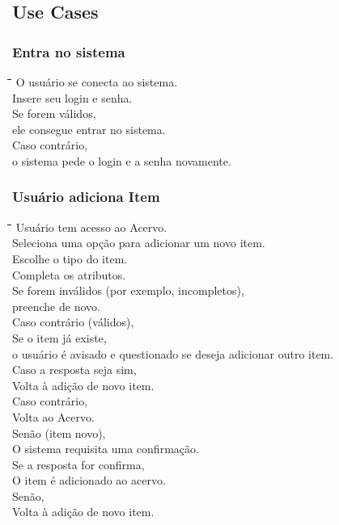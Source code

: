 \newcommand{\pgs}{\hspace{0.6cm}\=\hspace{0.5cm}\=\hspace{0.5cm}\=\hspace{0.5cm}\=\hspace{0.5cm}\=\hspace{0.5cm}\= \kill}

\subsection{Use Cases}

\subsubsection{Entra no sistema}
\begin{tabbing}
\pgs
\>\>O usuário se conecta ao sistema.\\
\>\>Insere seu login e senha.\\
\>\>Se forem válidos,\\
\>\>\>ele consegue entrar no sistema.\\
\>\>Caso contrário,\\
\>\>\>o sistema pede o login e a senha novamente.
\end{tabbing}

\subsubsection{Usuário adiciona Item}
\begin{tabbing}
\pgs
\>\>Usuário tem acesso ao Acervo.\\
\>\>Seleciona uma opção para adicionar um novo item.\\
\>\>Escolhe o tipo do item.\\
\>\>Completa os atributos.\\
\>\>Se forem inválidos (por exemplo, incompletos),\\
\>\>\>preenche de novo.\\
\>\>Caso contrário (válidos),\\
\>\>\>Se o item já existe,\\
\>\>\>\>o usuário é avisado e questionado se deseja adicionar outro item.\\
\>\>\>\>Caso a resposta seja sim,\\
\>\>\>\>\>Volta à adição de novo item.\\
\>\>\>\>Caso contrário,\\
\>\>\>\>\>Volta ao Acervo.\\
\>\>\>Senão (item novo),\\
\>\>\>\>O sistema requisita uma confirmação.\\
\>\>\>\>Se a resposta for confirma,\\
\>\>\>\>\>O item é adicionado ao acervo.\\
\>\>\>\>Senão,\\
\>\>\>\>\>Volta à adição de novo item.
\end{tabbing}

